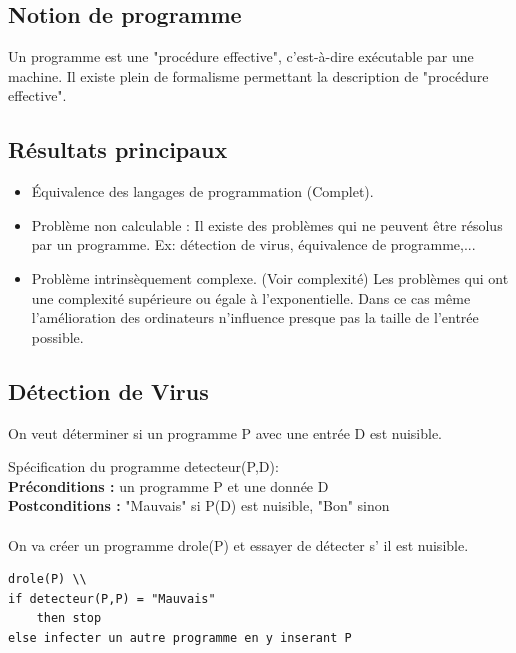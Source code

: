 \subsection{Notion de programme}
\label{ssub:notion_de_programme}

Un programme est une "procédure effective", c'est-à-dire exécutable par une machine.
Il existe plein de formalisme permettant la description de "procédure effective".


\subsection{Résultats principaux}
\label{sub:r_sultat_principaux}

\begin{itemize}
	\item Équivalence des langages de programmation (Complet).
	\item Problème non calculable : Il existe des problèmes qui ne peuvent 
		être résolus par un programme. Ex: détection de virus, équivalence
		de programme,...
	\item Problème intrinsèquement complexe. (Voir complexité) Les problèmes
		qui ont une complexité supérieure ou égale à l'exponentielle. Dans
		ce cas même l'amélioration des ordinateurs n'influence presque pas
		la taille de l'entrée possible.
\end{itemize}


\subsection{Détection de Virus}
\label{sub:d_tection_de_virus}
On veut déterminer si un programme P avec une entrée D est nuisible.

Spécification du programme detecteur(P,D):\\
\textbf{Préconditions :} un programme P et une donnée D\\
\textbf{Postconditions :} "Mauvais" si P(D) est nuisible,
		"Bon" sinon

\paragraph{}On va créer un programme drole(P) et essayer de détecter s’ il est nuisible.

\begin{lstlisting}
drole(P) \\
if detecteur(P,P) = "Mauvais" 
	then stop
else infecter un autre programme en y inserant P
\end{lstlisting}

